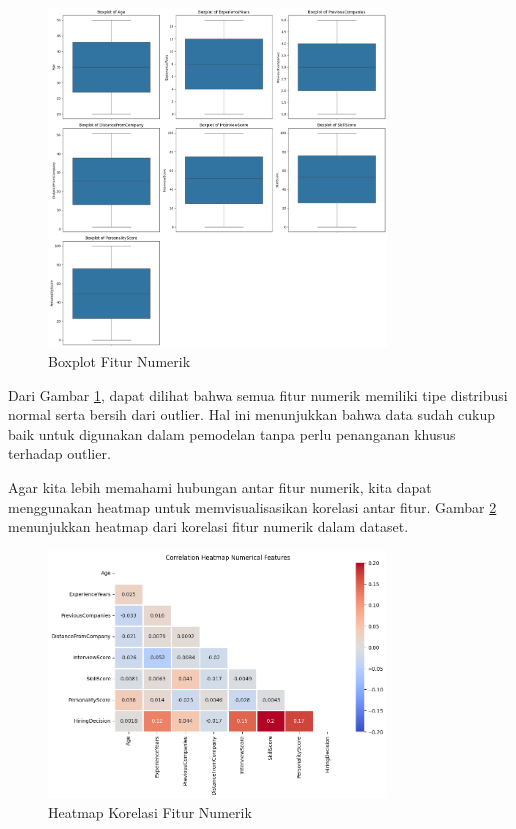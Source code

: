 \begin{figure}[H]
    \centering
    \includegraphics[width=0.8\textwidth]{gambar/boxplot_num.png}
    \caption{Boxplot Fitur Numerik}
    \label{fig:boxplot}
\end{figure}

Dari Gambar \ref{fig:boxplot}, dapat dilihat bahwa semua fitur numerik memiliki tipe distribusi normal serta bersih dari outlier. Hal ini menunjukkan bahwa data sudah cukup baik untuk digunakan dalam pemodelan tanpa perlu penanganan khusus terhadap outlier.

Agar kita lebih memahami hubungan antar fitur numerik, kita dapat menggunakan heatmap untuk memvisualisasikan korelasi antar fitur. Gambar \ref{fig:heatmap} menunjukkan heatmap dari korelasi fitur numerik dalam dataset.

\begin{figure}[H]
    \centering
    \includegraphics[width=0.8\textwidth]{gambar/heatmap.png}
    \caption{Heatmap Korelasi Fitur Numerik}
    \label{fig:heatmap}
\end{figure}


